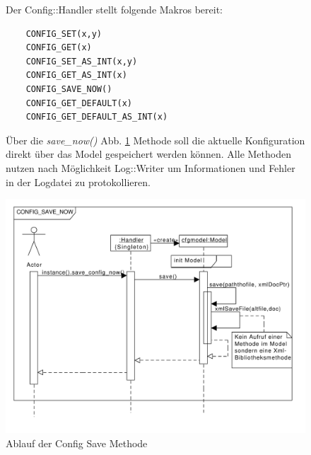 \begin{figure}[htb!]
    Der Config::Handler stellt folgende Makros bereit:
    \begin{verbatim}
    CONFIG_SET(x,y) 
    CONFIG_GET(x)   
    CONFIG_SET_AS_INT(x,y) 
    CONFIG_GET_AS_INT(x)   
    CONFIG_SAVE_NOW() 
    CONFIG_GET_DEFAULT(x)
    CONFIG_GET_DEFAULT_AS_INT(x)
    \end{verbatim}
\end{figure}

\begin{figure}[htb!]
Über die \emph{save\_now()} Abb. \ref{c_configsave} Methode soll die aktuelle Konfiguration direkt über das Model gespeichert werden können.
Alle Methoden nutzen nach Möglichkeit Log::Writer um Informationen und Fehler in der Logdatei zu protokollieren.


    \centering
    \includegraphics[width=\textwidth]{./gfx/seq/config_save}
    \caption{Ablauf der Config Save Methode}
    \label{c_configsave}
\end{figure}

